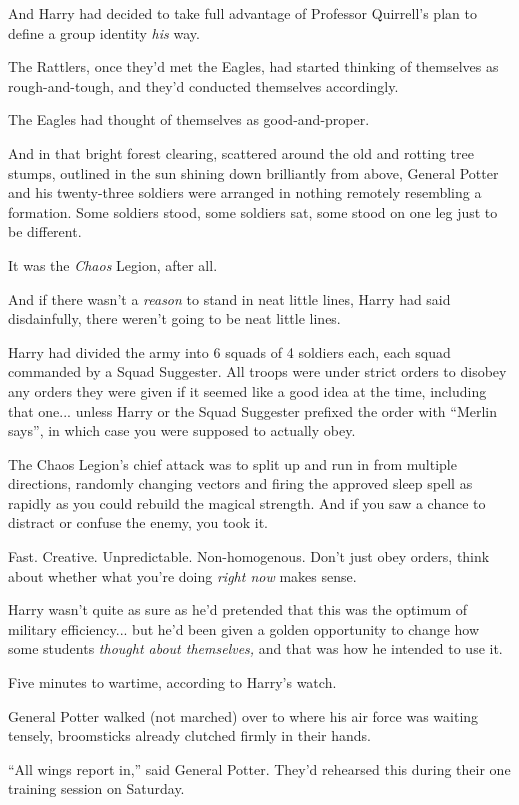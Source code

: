 And Harry had decided to take full advantage of Professor Quirrell's
plan to define a group identity \emph{his} way.

The Rattlers, once they'd met the Eagles, had started thinking of
themselves as rough-and-tough, and they'd conducted themselves
accordingly.

The Eagles had thought of themselves as good-and-proper.

And in that bright forest clearing, scattered around the old and rotting
tree stumps, outlined in the sun shining down brilliantly from above,
General Potter and his twenty-three soldiers were arranged in nothing
remotely resembling a formation. Some soldiers stood, some soldiers sat,
some stood on one leg just to be different.

It was the \emph{Chaos} Legion, after all.

And if there wasn't a \emph{reason} to stand in neat little lines, Harry
had said disdainfully, there weren't going to be neat little lines.

Harry had divided the army into 6 squads of 4 soldiers each, each squad
commanded by a Squad Suggester. All troops were under strict orders to
disobey any orders they were given if it seemed like a good idea at the
time, including that one... unless Harry or the Squad Suggester
prefixed the order with ``Merlin says'', in which case you were supposed
to actually obey.

The Chaos Legion's chief attack was to split up and run in from multiple
directions, randomly changing vectors and firing the approved sleep
spell as rapidly as you could rebuild the magical strength. And if you
saw a chance to distract or confuse the enemy, you took it.

Fast. Creative. Unpredictable. Non-homogenous. Don't just obey orders,
think about whether what you're doing \emph{right now} makes sense.

Harry wasn't quite as sure as he'd pretended that this was the optimum
of military efficiency... but he'd been given a golden opportunity
to change how some students \emph{thought about themselves,} and that
was how he intended to use it.

Five minutes to wartime, according to Harry's watch.

General Potter walked (not marched) over to where his air force was
waiting tensely, broomsticks already clutched firmly in their hands.

``All wings report in,'' said General Potter. They'd rehearsed this
during their one training session on Saturday.

